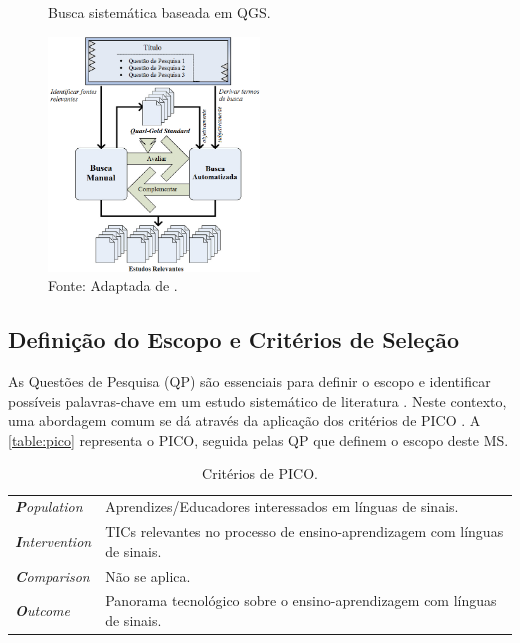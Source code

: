 \begin{figure}[htbp]
\caption{Busca sistemática baseada em QGS.}
\label{ms:zhang-approach}
\centerline{\includegraphics[width=0.5\textwidth]{images/zhang-systematic-mapping-approach.png}}
\caption*{Fonte: Adaptada de \cite{Zhang2011}.}
\end{figure}

\subsection{Definição do Escopo e Critérios de Seleção}
\label{ms:conducao-escopo}

As Questões de Pesquisa (QP) são essenciais para definir o escopo e identificar possíveis palavras-chave em um estudo sistemático de literatura \cite{Kitchenham2007,Petersen2015}. Neste contexto, uma abordagem comum se dá através da aplicação dos critérios de PICO \cite{Petticrew2008}. A \autoref{table:pico} representa o PICO, seguida pelas QP que definem o escopo deste MS.

\begin{table}[!ht]
\caption{Critérios de PICO.}
\label{table:pico}
\centering
\begin{tabular}{ll}
\toprule
\textit{\textbf{P}opulation} & Aprendizes/Educadores interessados em línguas de sinais. \\
\textit{\textbf{I}ntervention} & TICs relevantes no processo de ensino-aprendizagem com línguas de sinais. \\
\textit{\textbf{C}omparison} & Não se aplica. \\
\textit{\textbf{O}utcome} & Panorama tecnológico sobre o ensino-aprendizagem com línguas de sinais. \\ 
\bottomrule
\end{tabular}
\end{table}

